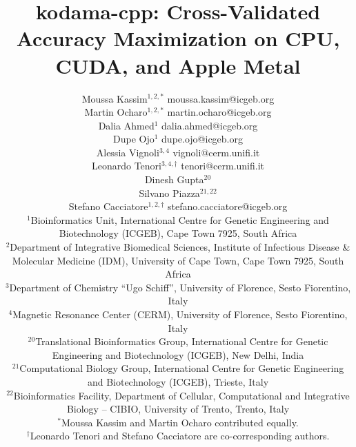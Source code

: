 \documentclass[twoside,11pt]{article}
\begin{document}
\title{kodama-cpp: Cross-Validated Accuracy Maximization on CPU, CUDA, and Apple Metal}

\author{%
\name Moussa Kassim$^{1,2,\ast}$ \email moussa.kassim@icgeb.org\\
\name Martin Ocharo$^{1,2,\ast}$ \email martin.ocharo@icgeb.org\\
\name Dalia Ahmed$^{1}$ \email dalia.ahmed@icgeb.org\\
\name Dupe Ojo$^{1}$ \email dupe.ojo@icgeb.org\\
\name Alessia Vignoli$^{3,4}$ \email vignoli@cerm.unifi.it\\
\name Leonardo Tenori$^{3,4,\dagger}$ \email tenori@cerm.unifi.it\\
\name Dinesh Gupta$^{20}$\\
\name Silvano Piazza$^{21,22}$\\
\name Stefano Cacciatore$^{1,2,\dagger}$ \email stefano.cacciatore@icgeb.org\\
\addr $^1$Bioinformatics Unit, International Centre for Genetic Engineering and Biotechnology (ICGEB), Cape Town 7925, South Africa\\
\addr $^2$Department of Integrative Biomedical Sciences, Institute of Infectious Disease \& Molecular Medicine (IDM), University of Cape Town, Cape Town 7925, South Africa\\
\addr $^3$Department of Chemistry ``Ugo Schiff'', University of Florence, Sesto Fiorentino, Italy\\
\addr $^4$Magnetic Resonance Center (CERM), University of Florence, Sesto Fiorentino, Italy\\
\addr $^{20}$Translational Bioinformatics Group, International Centre for Genetic Engineering and Biotechnology (ICGEB), New Delhi, India\\
\addr $^{21}$Computational Biology Group, International Centre for Genetic Engineering and Biotechnology (ICGEB), Trieste, Italy\\
\addr $^{22}$Bioinformatics Facility, Department of Cellular, Computational and Integrative Biology -- CIBIO, University of Trento, Trento, Italy\\
\addr $^{\ast}$Moussa Kassim and Martin Ocharo contributed equally.\\
\addr $^{\dagger}$Leonardo Tenori and Stefano Cacciatore are co-corresponding authors.}

\maketitle
\end{document}
